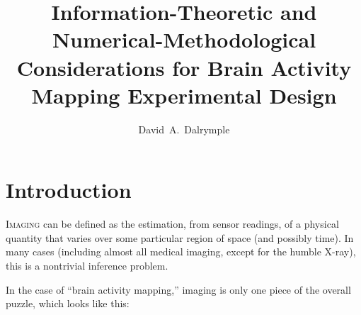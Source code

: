 
%

\title{Information-Theoretic and Numerical-Methodological Considerations for Brain Activity Mapping Experimental Design}

\author[1,2]{David~A.~Dalrymple}


\newcommand\et{{\em \&}}


\renewcommand{\maketitlehookc}{{\small\raggedright Correspondence to: \texttt{david\,\textnormal{(at)}\,\,dalrymple.co}}}


\maketitle
\pagestyle{plain}
\thispagestyle{empty}

\section{Introduction}

\textsc{Imaging} can be defined as the estimation, from sensor readings, of a physical quantity that varies over some particular region of space (and possibly time). In many cases (including almost all medical imaging, except for the humble X-ray), this is a nontrivial inference problem.

In the case of ``brain activity mapping,'' imaging is only one piece of the overall puzzle, which looks like this:

